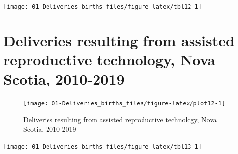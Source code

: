 \documentclass[
]{krantz}
\begin{document}
\begin{center}\texttt{[image: 01-Deliveries\_births\_files/figure-latex/tbl12-1]} \end{center}

\hypertarget{section-14}{%
\section{Deliveries resulting from assisted reproductive technology, Nova Scotia, 2010-2019}\label{section-14}}

\begin{figure}[h]

{\centering \texttt{[image: 01-Deliveries\_births\_files/figure-latex/plot12-1]} 

}

\caption{Deliveries resulting from assisted reproductive technology, Nova Scotia, 2010-2019}\label{fig:plot12}
\end{figure}

\begin{center}\texttt{[image: 01-Deliveries\_births\_files/figure-latex/tbl13-1]} \end{center}

\backmatter
\printindex
\end{document}
